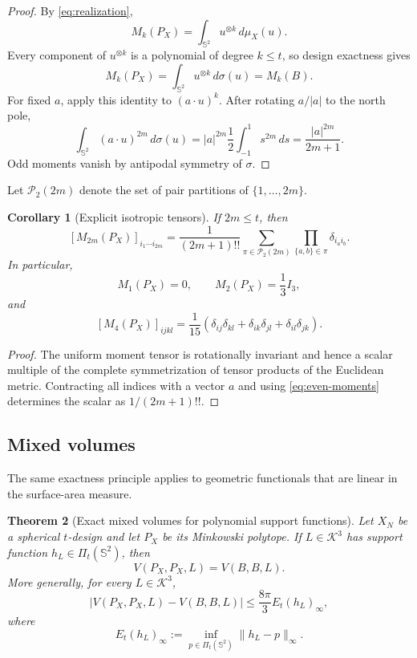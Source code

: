 \documentclass[11pt]{article}
\newtheorem{theorem}{Theorem}[section]
\newtheorem{corollary}[theorem]{Corollary}
\theoremstyle{definition}
\theoremstyle{remark}
\newcommand{\Sph}{\mathbb S}
\newcommand{\K}{\mathcal K}
\begin{document}
\begin{proof}
By \eqref{eq:realization},
\[
M_k(P_X)=\int_{\Sph^2}u^{\otimes k}\,d\mu_X(u).
\]
Every component of $u^{\otimes k}$ is a polynomial of degree $k\le t$, so design exactness gives
\[
M_k(P_X)=\int_{\Sph^2}u^{\otimes k}\,d\sigma(u)=M_k(B).
\]
For fixed $a$, apply this identity to $(a\cdot u)^k$. After rotating $a/|a|$ to the north pole,
\[
\int_{\Sph^2}(a\cdot u)^{2m}\,d\sigma(u)
=|a|^{2m}\frac12\int_{-1}^1s^{2m}\,ds
=\frac{|a|^{2m}}{2m+1}.
\]
Odd moments vanish by antipodal symmetry of $\sigma$.
\end{proof}

Let $\mathcal P_2(2m)$ denote the set of pair partitions of $\{1,\dots,2m\}$.

\begin{corollary}[Explicit isotropic tensors]\label{cor:explicit-tensors}
If $2m\le t$, then
\begin{equation}\label{eq:explicit-tensor}
[M_{2m}(P_X)]_{i_1\cdots i_{2m}}
=\frac1{(2m+1)!!}
\sum_{\pi\in\mathcal P_2(2m)}\prod_{\{a,b\}\in\pi}\delta_{i_ai_b}.
\end{equation}
In particular,
\[
M_1(P_X)=0,\qquad M_2(P_X)=\frac13I_3,
\]
and
\[
[M_4(P_X)]_{ijkl}
=\frac1{15}(\delta_{ij}\delta_{kl}+\delta_{ik}\delta_{jl}+\delta_{il}\delta_{jk}).
\]
\end{corollary}

\begin{proof}
The uniform moment tensor is rotationally invariant and hence a scalar multiple of the complete symmetrization of tensor products of the Euclidean metric. Contracting all indices with a vector $a$ and using \eqref{eq:even-moments} determines the scalar as $1/(2m+1)!!$.
\end{proof}

\subsection{Mixed volumes}
The same exactness principle applies to geometric functionals that are linear in the surface-area measure.

\begin{theorem}[Exact mixed volumes for polynomial support functions]\label{thm:mixed-exact}
Let $X_N$ be a spherical $t$-design and let $P_X$ be its Minkowski polytope. If $L\in\K^3$ has support function $h_L\in\Pi_t(\Sph^2)$, then
\begin{equation}\label{eq:mixed-exact}
V(P_X,P_X,L)=V(B,B,L).
\end{equation}
More generally, for every $L\in\K^3$,
\begin{equation}\label{eq:mixed-error}
|V(P_X,P_X,L)-V(B,B,L)|\le\frac{8\pi}{3}E_t(h_L)_\infty,
\end{equation}
where
\[
E_t(h_L)_\infty:=\inf_{p\in\Pi_t(\Sph^2)}\|h_L-p\|_\infty.
\]
\end{theorem}
\end{document}
